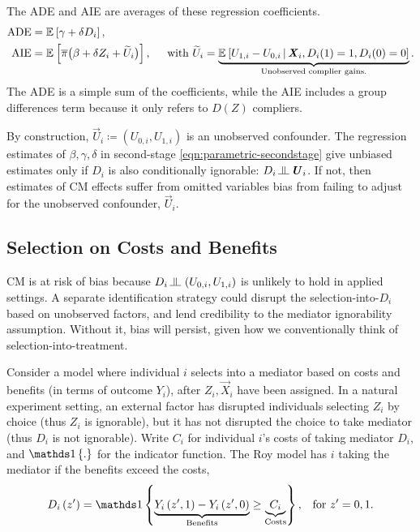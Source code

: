 The ADE and AIE are averages of these regression coefficients.
\begin{align*}
    \text{ADE}
        &= \mathbb{E}_{} \left[ \gamma + \delta D_i \right], \\
    \text{AIE}
        &= \mathbb{E}_{} \left[  \overline{\pi} \big( \beta +  \delta Z_i + \widetilde{U}_i \big) \right],
        \;\;\;\; \text{ with } \widetilde{U}_i
            = \underbrace{\mathbb{E}_{} \left[  U_{1,i} - U_{0,i} \, \middle\vert \, 
                \boldsymbol{\mathit{X}}_i, D_i(1) = 1, D_i(0) = 0 \right]}_{
                    \text{Unobserved complier gains.}}.
\end{align*}
The ADE is a simple sum of the coefficients, while the AIE includes a group differences term because it only refers to $D(Z)$ compliers.

By construction, $\vec U_i \coloneqq \left(U_{0, i}, U_{1, i} \right)$ is an unobserved confounder.
The regression estimates of $\beta, \gamma, \delta$ in second-stage \eqref{eqn:parametric-secondstage} give unbiased estimates only if $D_i$ is also conditionally ignorable: $D_i \indep  \vec U_{i} $.
If not, then estimates of CM effects suffer from omitted variables bias from failing to adjust for the unobserved confounder, $\vec U_i$.

\subsection{Selection on Costs and Benefits}
CM is at risk of bias because $D_i \indep  \left(U_{0, i}, U_{1, i} \right)$ is unlikely to hold in applied settings.
A separate identification strategy could disrupt the selection-into-$D_i$ based on unobserved factors, and lend credibility to the mediator ignorability assumption.
Without it, bias will persist, given how we conventionally think of selection-into-treatment.

Consider a model where individual $i$ selects into a mediator based on costs and benefits (in terms of outcome $Y_i$), after $Z_i, \vec X_i$ have been assigned.
In a natural experiment setting, an external factor has disrupted individuals selecting $Z_i$ by choice (thus $Z_i$ is ignorable), but it has not disrupted the choice to take mediator (thus $D_i$ is not ignorable).
Write $C_i$ for individual $i$'s costs of taking mediator $D_i$, and $\indicator{.}$ for the indicator function.
The Roy model has $i$ taking the mediator if the benefits exceed the costs,
\begin{equation}
    \label{eqn:roy-model}
    D_i \left( z' \right) = \indicator{
    \underbrace{Y_i\left( z', 1 \right) - Y_i\left( z', 0 \right)}_{\text{Benefits}}
    \geq \underbrace{C_i}_{\text{Costs}}}, \;\;\; \text{for } z'=0,1.
\end{equation}

